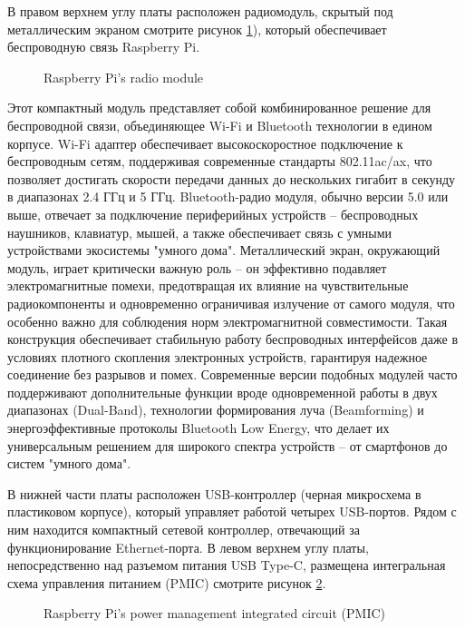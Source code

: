 В правом верхнем углу платы расположен радиомодуль, скрытый под металлическим экраном смотрите рисунок \ref{fig:radio_module}), который обеспечивает беспроводную связь Raspberry Pi.

\begin{figure}[H]
	\centering
	\caption{Raspberry Pi’s radio module}
	\label{fig:radio_module}
\end{figure}

Этот компактный модуль представляет собой комбинированное решение для беспроводной связи, объединяющее Wi-Fi и Bluetooth технологии в едином корпусе. Wi-Fi адаптер обеспечивает высокоскоростное подключение к беспроводным сетям, поддерживая современные стандарты 802.11ac/ax, что позволяет достигать скорости передачи данных до нескольких гигабит в секунду в диапазонах 2.4 ГГц и 5 ГГц. Bluetooth-радио модуля, обычно версии 5.0 или выше, отвечает за подключение периферийных устройств -- беспроводных наушников, клавиатур, мышей, а также обеспечивает связь с умными устройствами экосистемы "умного дома". Металлический экран, окружающий модуль, играет критически важную роль -- он эффективно подавляет электромагнитные помехи, предотвращая их влияние на чувствительные радиокомпоненты и одновременно ограничивая излучение от самого модуля, что особенно важно для соблюдения норм электромагнитной совместимости. Такая конструкция обеспечивает стабильную работу беспроводных интерфейсов даже в условиях плотного скопления электронных устройств, гарантируя надежное соединение без разрывов и помех. Современные версии подобных модулей часто поддерживают дополнительные функции вроде одновременной работы в двух диапазонах (Dual-Band), технологии формирования луча (Beamforming) и энергоэффективные протоколы Bluetooth Low Energy, что делает их универсальным решением для широкого спектра устройств -- от смартфонов до систем "умного дома".


В нижней части платы расположен USB-контроллер (черная микросхема в пластиковом корпусе), который управляет работой четырех USB-портов. Рядом с ним находится компактный сетевой контроллер, отвечающий за функционирование Ethernet-порта. В левом верхнем углу платы, непосредственно над разъемом питания USB Type-C, размещена интегральная схема управления питанием (PMIC) смотрите рисунок \ref{fig:pmic}.

\begin{figure}[H]
	\centering
	\caption{Raspberry Pi’s power management integrated circuit (PMIC)}
	\label{fig:pmic}
\end{figure}

